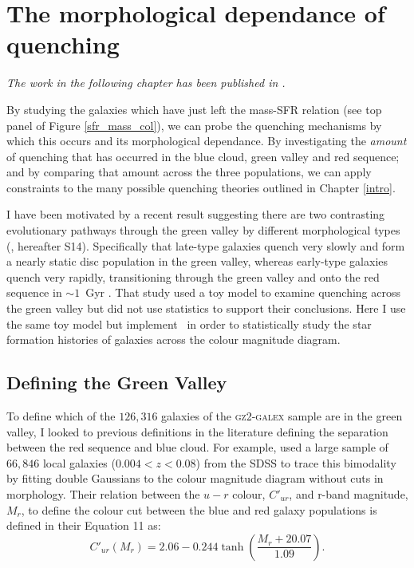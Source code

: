\chapter{The morphological dependance of quenching}\label{morph}

\emph{The work in the following chapter has been published in \citet{smethurst15}.}


By studying the galaxies which  have just left the mass-SFR relation (see top panel of Figure \ref{sfr_mass_col}), we can probe the quenching mechanisms by which this occurs and its morphological dependance. By investigating the \emph{amount} of quenching that has occurred in the blue cloud, green valley and red sequence; and by comparing that amount across the three populations, we can apply constraints to the many possible quenching theories outlined in Chapter \ref{intro}. 

I have been motivated by a recent result suggesting there are two contrasting evolutionary pathways through the green valley by different morphological types (\citealt{schawinski14}, hereafter S14). Specifically that late-type galaxies quench very slowly and form a nearly static disc population in the green valley, whereas early-type galaxies quench very rapidly, transitioning through the green valley and onto the red sequence in $\sim 1$~Gyr \citep{Wong12}. That study used a toy model to examine quenching across the green valley but did not use statistics to support their conclusions. Here I use the same toy model but implement \starpy ~in order to statistically study the star formation histories of galaxies across the colour magnitude diagram.


\section{Defining the Green Valley}\label{defGV}

To define which of the $126, 316$ galaxies of the \textsc{gz2-galex} sample are in the green valley, I looked to previous definitions in the literature defining the separation between the red sequence and blue cloud. For example, \citet{Baldry04} used a large sample of $66,846$ local galaxies ($0.004 < z < 0.08$) from the SDSS to trace this bimodality by fitting double Gaussians to the colour magnitude diagram without cuts in morphology. Their relation between the $u-r$ colour, $C'_{ur}$, and r-band magnitude, $M_r$, to define the colour cut between the blue and red galaxy populations is defined in their Equation 11 as:
\begin{equation}\label{eqgv}
C'_{ur}(M_{r}) = 2.06 - 0.244 \tanh \left( \frac{M_r + 20.07}{1.09}\right).
\end{equation}

